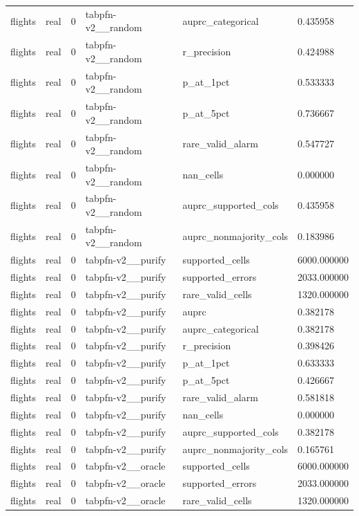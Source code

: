 \begin{tabular}{llllll}
flights & real & 0 & tabpfn-v2\_\_random & auprc\_categorical & 0.435958 \\
flights & real & 0 & tabpfn-v2\_\_random & r\_precision & 0.424988 \\
flights & real & 0 & tabpfn-v2\_\_random & p\_at\_1pct & 0.533333 \\
flights & real & 0 & tabpfn-v2\_\_random & p\_at\_5pct & 0.736667 \\
flights & real & 0 & tabpfn-v2\_\_random & rare\_valid\_alarm & 0.547727 \\
flights & real & 0 & tabpfn-v2\_\_random & nan\_cells & 0.000000 \\
flights & real & 0 & tabpfn-v2\_\_random & auprc\_supported\_cols & 0.435958 \\
flights & real & 0 & tabpfn-v2\_\_random & auprc\_nonmajority\_cols & 0.183986 \\
flights & real & 0 & tabpfn-v2\_\_purify & supported\_cells & 6000.000000 \\
flights & real & 0 & tabpfn-v2\_\_purify & supported\_errors & 2033.000000 \\
flights & real & 0 & tabpfn-v2\_\_purify & rare\_valid\_cells & 1320.000000 \\
flights & real & 0 & tabpfn-v2\_\_purify & auprc & 0.382178 \\
flights & real & 0 & tabpfn-v2\_\_purify & auprc\_categorical & 0.382178 \\
flights & real & 0 & tabpfn-v2\_\_purify & r\_precision & 0.398426 \\
flights & real & 0 & tabpfn-v2\_\_purify & p\_at\_1pct & 0.633333 \\
flights & real & 0 & tabpfn-v2\_\_purify & p\_at\_5pct & 0.426667 \\
flights & real & 0 & tabpfn-v2\_\_purify & rare\_valid\_alarm & 0.581818 \\
flights & real & 0 & tabpfn-v2\_\_purify & nan\_cells & 0.000000 \\
flights & real & 0 & tabpfn-v2\_\_purify & auprc\_supported\_cols & 0.382178 \\
flights & real & 0 & tabpfn-v2\_\_purify & auprc\_nonmajority\_cols & 0.165761 \\
flights & real & 0 & tabpfn-v2\_\_oracle & supported\_cells & 6000.000000 \\
flights & real & 0 & tabpfn-v2\_\_oracle & supported\_errors & 2033.000000 \\
flights & real & 0 & tabpfn-v2\_\_oracle & rare\_valid\_cells & 1320.000000 \\

\end{tabular}
